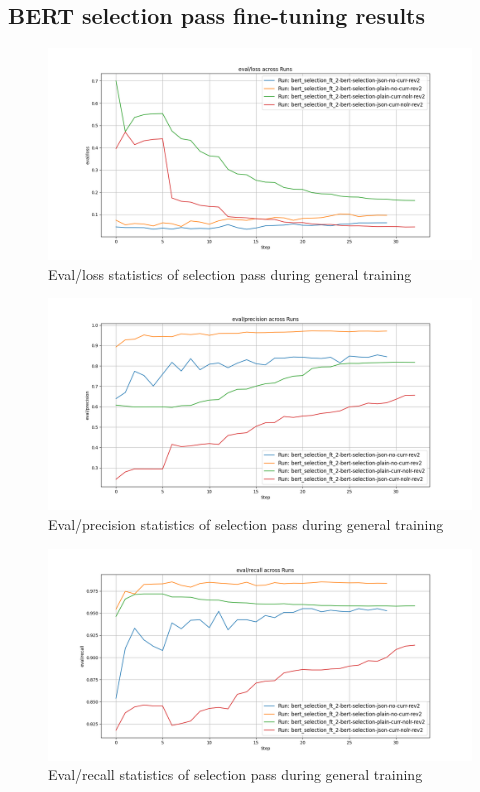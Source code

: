 \documentclass[licencjacka,en]{pracamgr}
\begin{document}
\begin{appendices}
\chapter{BERT selection pass fine-tuning results} \label{AppC}
\begin{figure}[h]
    \centering
    \includegraphics[width=0.8\linewidth]{bachelor_images/s_elg.png}
    \caption{Eval/loss statistics of selection pass during general training}
    \label{fig:s_elg}
\end{figure}
\begin{figure}[h]
    \centering
    \includegraphics[width=0.8\linewidth]{bachelor_images/s_epg.png}
    \caption{Eval/precision statistics of selection pass during general training}
    \label{fig:s_epg}
\end{figure}
\begin{figure}[h]
    \centering
    \includegraphics[width=0.8\linewidth]{bachelor_images/s_erg.png}
    \caption{Eval/recall statistics of selection pass during general training}
    \label{fig:s_erg}
\end{figure}


\end{appendices}
\end{document}

